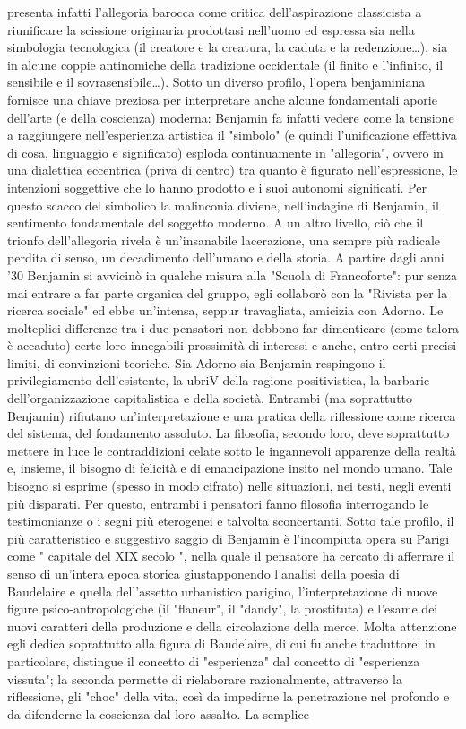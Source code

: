 presenta infatti l'allegoria barocca come critica dell'aspirazione classicista a riunificare la scissione originaria prodottasi nell'uomo ed espressa sia nella simbologia tecnologica (il creatore e la creatura, la caduta e la redenzione…), sia in alcune coppie antinomiche della tradizione occidentale (il finito e l'infinito, il sensibile e il sovrasensibile…). Sotto un diverso profilo, l'opera benjaminiana fornisce una chiave preziosa per interpretare anche alcune fondamentali aporie dell'arte (e della coscienza) moderna: Benjamin fa infatti vedere come la tensione a raggiungere nell'esperienza artistica il "simbolo" (e quindi l'unificazione effettiva di cosa, linguaggio e significato) esploda continuamente in "allegoria", ovvero in una dialettica eccentrica (priva di centro) tra quanto è figurato nell'espressione, le intenzioni soggettive che lo hanno prodotto e i suoi autonomi significati. Per questo scacco del simbolico la malinconia diviene, nell'indagine di Benjamin, il sentimento fondamentale del soggetto moderno. A un altro livello, ciò che il trionfo dell'allegoria rivela è un'insanabile lacerazione, una sempre più radicale perdita di senso, un decadimento dell'umano e della storia. A partire dagli anni '30 Benjamin si avvicinò in qualche misura alla "Scuola di Francoforte": pur senza mai entrare a far parte organica del gruppo, egli collaborò con la "Rivista per la ricerca sociale" ed ebbe un'intensa, seppur travagliata, amicizia con Adorno. Le molteplici differenze tra i due pensatori non debbono far dimenticare (come talora è accaduto) certe loro innegabili prossimità di interessi e anche, entro certi precisi limiti, di convinzioni teoriche. Sia Adorno sia Benjamin respingono il privilegiamento dell'esistente, la ubriV della ragione positivistica, la barbarie dell'organizzazione capitalistica e della società. Entrambi (ma soprattutto Benjamin) rifiutano un'interpretazione e una pratica della riflessione come ricerca del sistema, del fondamento assoluto. La filosofia, secondo loro, deve soprattutto mettere in luce le contraddizioni celate sotto le ingannevoli apparenze della realtà e, insieme, il bisogno di felicità e di emancipazione insito nel mondo umano. Tale bisogno si esprime (spesso in modo cifrato) nelle situazioni, nei testi, negli eventi più disparati. Per questo, entrambi i pensatori fanno filosofia interrogando le testimonianze o i segni più eterogenei e talvolta sconcertanti. Sotto tale profilo, il più caratteristico e suggestivo saggio di Benjamin è l'incompiuta opera su Parigi come " capitale del XIX secolo ", nella quale il pensatore ha cercato di afferrare il senso di un'intera epoca storica giustapponendo l'analisi della poesia di Baudelaire e quella dell'assetto urbanistico parigino, l'interpretazione di nuove figure psico-antropologiche (il "flaneur", il "dandy", la prostituta) e l'esame dei nuovi caratteri della produzione e della circolazione della merce. Molta attenzione egli dedica soprattutto alla figura di Baudelaire, di cui fu anche traduttore: in particolare, distingue il concetto di "esperienza" dal concetto di "esperienza vissuta"; la seconda permette di rielaborare razionalmente, attraverso la riflessione, gli "choc" della vita, così da impedirne la penetrazione nel profondo e da difenderne la coscienza dal loro assalto. La semplice 